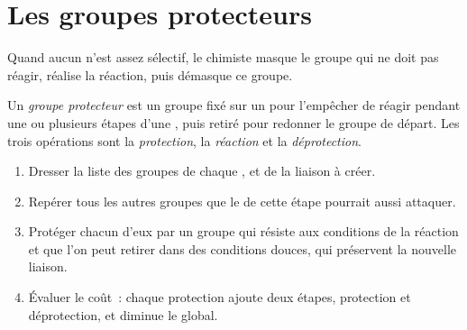 \section{Les groupes protecteurs}

Quand aucun  n'est assez sélectif, le chimiste masque le groupe
qui ne doit pas réagir, réalise la réaction, puis démasque ce groupe.

\begin{definition}\label{def:g12:synthesis-strategy:protecting-group}
Un \emph{groupe protecteur} est un groupe fixé
sur un  pour l'empêcher de réagir pendant une ou
plusieurs étapes d'une , puis retiré pour redonner le groupe de
départ. Les trois opérations sont la \emph{protection}, la
\emph{réaction} et la
\emph{déprotection}.
\end{definition}

\begin{method}\label{met:g12:synthesis-strategy:plan}
\begin{enumerate}
  \item Dresser la liste des groupes de chaque , et de la liaison
        à créer.
  \item Repérer tous les autres groupes que le  de cette étape
        pourrait aussi attaquer.
  \item Protéger chacun d'eux par un groupe qui résiste aux conditions de
        la réaction et que l'on peut retirer dans des conditions douces,
        qui préservent la nouvelle liaison.
  \item Évaluer le coût~: chaque protection ajoute deux étapes,
        protection et déprotection, et diminue le  global.
\end{enumerate}
\end{method}

